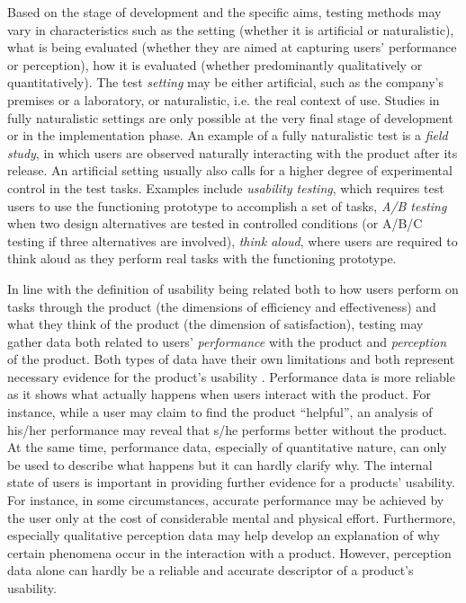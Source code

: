 Based on the stage of development and the specific aims, testing methods may vary in characteristics such as the setting (whether it is artificial or naturalistic), what is being evaluated (whether they are aimed at capturing users’ performance or perception), how it is evaluated (whether predominantly qualitatively or quantitatively). The test \textit{setting} may be either artificial, such as the company’s premises or a laboratory, or naturalistic, i.e. the real context of use. Studies in fully naturalistic settings are only possible at the very final stage of development or in the implementation phase. An example of a fully naturalistic test is a \textit{field study}, in which users are observed naturally interacting with the product after its release. An artificial setting usually also calls for a higher degree of experimental control in the test tasks. Examples include \textit{usability testing}, which requires test users to use the functioning prototype to accomplish a set of tasks, \textit{A/B testing} when two design alternatives are tested in controlled conditions (or A/B/C testing if three alternatives are involved), \textit{think aloud}, where users are required to think aloud as they perform real tasks with the functioning prototype.

In line with the definition of usability being related both to how users perform on tasks through the product (the dimensions of efficiency and effectiveness) and what they think of the product (the dimension of satisfaction), testing may gather data both related to users’ \textit{performance} with the product and \textit{perception} of the product. Both types of data have their own limitations and both represent necessary evidence for the product’s usability \citep{bevana1991usability}. Performance data is more reliable as it shows what actually happens when users interact with the product. For instance, while a user may claim to find the product “helpful”, an analysis of his/her performance may reveal that s/he performs better without the product. At the same time, performance data, especially of quantitative nature, can only be used to describe what happens but it can hardly clarify why. The internal state of users is important in providing further evidence for a products’ usability. For instance, in some circumstances, accurate performance may be achieved by the user only at the cost of considerable mental and physical effort. Furthermore, especially qualitative perception data may help develop an explanation of why certain phenomena occur in the interaction with a product. However, perception data alone can hardly be a reliable and accurate descriptor of a product’s usability.

